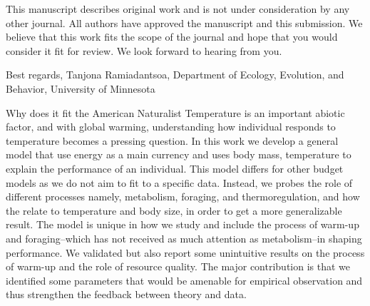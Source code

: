 
This manuscript describes original work and is not under consideration by any other journal.
All authors have approved the manuscript and this submission.
We believe that this work fits the scope of the journal and hope that you would consider it fit for review.
We look forward to hearing from you.

Best regards,
Tanjona Ramiadantsoa,
Department of Ecology, Evolution, and Behavior, University of Minnesota

Why does it fit the American Naturalist
Temperature is an important abiotic factor, and with global warming, understanding how individual responds to temperature becomes a pressing question.
In this work we develop a general model that use energy as a main currency and uses body mass, temperature to explain the performance of an individual.
This model differs for other budget models as we do not aim to fit to a specific data.
Instead, we probes the role of different processes namely, metabolism, foraging,  and thermoregulation, and how the relate to temperature and body size, in order to get a more generalizable result.
The model is unique in how we study and include the process of warm-up and foraging--which has not received as much attention as metabolism--in shaping performance.
We validated but also report some unintuitive results on the process of warm-up and the role of resource quality.
The major contribution is that we identified some parameters that would be amenable for empirical observation and thus strengthen the feedback between theory and data.
